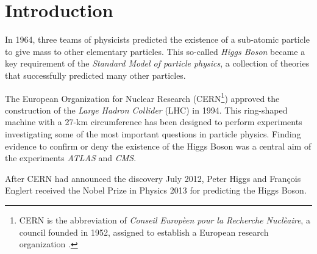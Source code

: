 \section{Introduction}\label{ch:intro}\raggedbottom
%
In 1964, three teams of physicists predicted the existence of a sub-atomic particle to give mass to other elementary particles. This so-called \emph{Higgs Boson} became a key requirement of the \emph{Standard Model of particle physics}, a collection of theories that successfully predicted many other particles.

The European Organization for Nuclear Research (CERN\footnote{CERN is the abbreviation of \emph{Conseil Europ\`een pour la Recherche Nucl\`eaire}, a council founded in 1952, assigned to establish a European research organization \cite{cernHP}.}) approved the construction of the \emph{Large Hadron Collider} (LHC) in 1994. This ring-shaped machine with a 27-km circumference has been designed to perform experiments investigating some of the most important questions in particle physics. Finding evidence to confirm or deny the existence of the Higgs Boson was a central aim of the experiments \emph{ATLAS} and \emph{CMS}.

After CERN had announced the discovery July 2012, Peter Higgs and Fran\c{c}ois Englert received the Nobel Prize in Physics 2013 for predicting the Higgs Boson.


